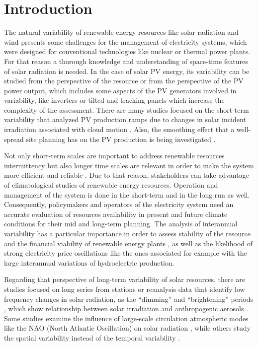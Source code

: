 \section{Introduction}

The natural variability of renewable energy resources like solar radiation and wind presents some challenges for the management of electricity systems, which were designed for conventional technologies like nuclear or thermal power plants. For that reason a thorough knowledge and understanding of space-time features of solar radiation is needed. In the case of solar PV energy,  its variability \cite*{Widen2015} can be studied from the perspective of the resource or from the perspective of the PV power output, which includes some aspects of the PV generators involved in variability, like inverters or tilted and tracking panels which increase the complexity of the assessment. There are many studies focused on the short-term variability \cite*{Zamo.Mestre.ea2014} that analyzed PV production ramps due to changes in solar incident irradiation associated with cloud motion \cite*{Cros2014, IEA-PVPS-T14-1.32015}. Also, the smoothing effect that a well-spread site planning has on the PV production is being investigated \cite*{Marcos2012, Perpinan.Marcos.ea2013}.

Not only short-term scales are important to address renewable resources intermittency but also longer time scales are relevant in order to make the system more efficient and reliable \cite*{Davy2012}. Due to that reason, stakeholders can take advantage of climatological studies of renewable energy resources. Operation and management of the system is done in the short-term and in the long run as well. Consequently, policymakers and operators of the electricity system need an accurate evaluation of resources availability in present and future climate conditions for their mid and long-term planning. The analysis of interannual variability has a particular importance in order to assess stability of the resource and the financial viability of renewable energy plants \cite*{pryor2006inter}, as well as the likelihood of strong electricity price oscillations like the ones associated for example with the large interannual variations of hydroelectric production.

Regarding that perspective of long-term variability of solar resources, there are studies focused on long series from stations \cite*{Sanchez-Lorenzo2009, Sanchez-Lorenzo2013, vazquez2012interannual} or reanalysis data that identify low frequency changes in solar radiation, as the “dimming” and “brightening” periods \cite*{Wild2005}, which show relationship between solar irradiation and anthropogenic aerosols \cite*{Nabat2015}. Some studies examine the influence of large-scale circulation atmospheric modes like the NAO (North Atlantic Oscillation) on solar radiation \cite*{Pozo-Vazquez2004, Jerez2013}, while others study the spatial variability instead of the temporal variability \cite*{GueymardWilcox2011a}. 

